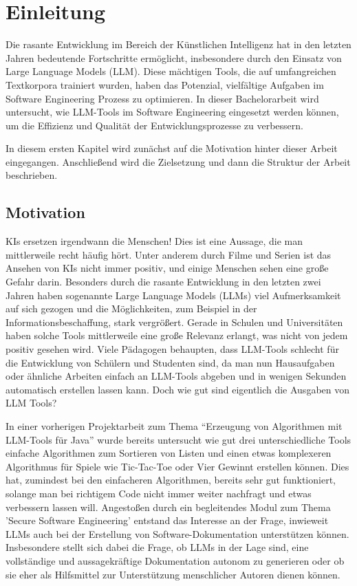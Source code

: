 
\chapter{Einleitung} 

Die rasante Entwicklung im Bereich der Künstlichen Intelligenz hat in den letzten Jahren bedeutende Fortschritte ermöglicht, 
insbesondere durch den Einsatz von Large Language Models (LLM). Diese mächtigen Tools, die auf umfangreichen Textkorpora 
trainiert wurden, haben das Potenzial, vielfältige Aufgaben im Software Engineering Prozess zu optimieren. 
In dieser Bachelorarbeit wird untersucht, wie LLM-Tools im Software Engineering eingesetzt werden können, um die Effizienz und 
Qualität der Entwicklungsprozesse zu verbessern.

In diesem ersten Kapitel wird zunächst auf die Motivation hinter dieser Arbeit eingegangen. Anschließend wird die Zielsetzung 
und dann die Struktur der Arbeit beschrieben.

\section{Motivation}  \label{Motivation}

KIs ersetzen irgendwann die Menschen! Dies ist eine Aussage, die man mittlerweile recht häufig hört. Unter anderem durch Filme 
und Serien ist das Ansehen von KIs nicht immer positiv, und einige Menschen sehen eine große Gefahr darin. Besonders durch die 
rasante Entwicklung in den letzten zwei Jahren haben sogenannte Large Language Models (LLMs) viel Aufmerksamkeit auf sich gezogen 
und die Möglichkeiten, zum Beispiel in der Informationsbeschaffung, stark vergrößert. Gerade in Schulen und Universitäten haben 
solche Tools mittlerweile eine große Relevanz erlangt, was nicht von jedem positiv gesehen wird. Viele Pädagogen behaupten, dass 
LLM-Tools schlecht für die Entwicklung von Schülern und Studenten sind, da man nun Hausaufgaben oder ähnliche Arbeiten einfach an 
LLM-Tools abgeben und in wenigen Sekunden automatisch erstellen lassen kann. Doch wie gut sind eigentlich die Ausgaben von LLM Tools?

In einer vorherigen Projektarbeit zum Thema ``Erzeugung von Algorithmen mit LLM-Tools für Java'' wurde bereits untersucht 
wie gut drei unterschiedliche Tools einfache Algorithmen zum Sortieren von Listen und einen etwas komplexeren Algorithmus 
für Spiele wie Tic-Tac-Toe oder Vier Gewinnt erstellen können. Dies hat, zumindest bei den einfacheren Algorithmen, bereits 
sehr gut funktioniert, solange man bei richtigem Code nicht immer weiter nachfragt und etwas verbessern lassen will.
Angestoßen durch ein begleitendes Modul zum Thema 'Secure Software Engineering' entstand das Interesse an der Frage, inwieweit 
LLMs auch bei der Erstellung von Software-Dokumentation unterstützen können. Insbesondere stellt sich dabei die Frage, ob LLMs 
in der Lage sind, eine vollständige und aussagekräftige Dokumentation autonom zu generieren oder ob sie eher als Hilfsmittel zur 
Unterstützung menschlicher Autoren dienen können.

